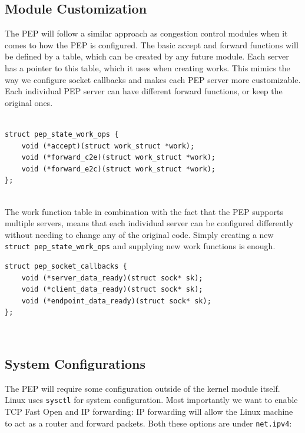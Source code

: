 \documentclass[a4paper,english, 12pt]{report}
\begin{document}
\subsection{Module Customization}
The PEP will follow a similar approach as congestion control modules when it comes to how the PEP is configured. The basic accept and forward functions will be defined by a table, which can be created by any future module. Each server has a pointer to this table, which it uses when creating works. This mimics the way we configure socket callbacks and makes each PEP server more customizable. Each individual PEP server can have different forward functions, or keep the original ones.\\\\

\noindent\begin{minipage}{\linewidth}
\begin{verbatim}
struct pep_state_work_ops {
    void (*accept)(struct work_struct *work);
    void (*forward_c2e)(struct work_struct *work);
    void (*forward_e2c)(struct work_struct *work);
};
\end{verbatim}
\end{minipage}\\

The work function table in combination with the fact that the PEP supports multiple servers, means that each individual server can be configured differently without needing to change any of the original code. Simply creating a new \verb|struct pep_state_work_ops| and supplying new work functions is enough.\\

\noindent\begin{minipage}{\linewidth}
\begin{verbatim}
struct pep_socket_callbacks {
    void (*server_data_ready)(struct sock* sk);
    void (*client_data_ready)(struct sock* sk);
    void (*endpoint_data_ready)(struct sock* sk);
};
\end{verbatim}
\end{minipage}\\

\subsection{System Configurations}
The PEP will require some configuration outside of the kernel module itself. Linux uses \verb|sysctl| for system configuration. Most importantly we want to enable TCP Fast Open and IP forwarding: IP forwarding will allow the Linux machine to act as a router and forward packets. Both these options are under \verb|net.ipv4|:\\
\end{document}
